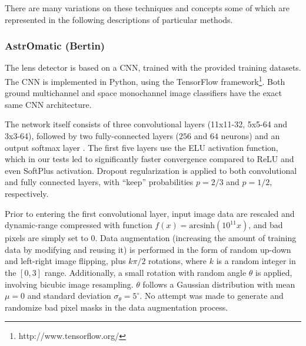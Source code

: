 \documentclass{aa}
\newcommand{\fl}[1]{{\color{magenta}FL: #1}}
\begin{document}
There are many variations on these techniques and concepts some of which are represented in the following descriptions of particular methods.  

\subsubsection{AstrOmatic (Bertin)}

The lens detector is based on a CNN, trained with the provided training datasets. The CNN is implemented in Python, using the TensorFlow framework\footnote{http://www.tensorflow.org/}. Both ground multichannel and space monochannel image classifiers have the exact same CNN architecture.

The network itself consists of three convolutional layers (11x11-32, 5x5-64 and 3x3-64), followed by two fully-connected layers ($256$ and $64$ neurons) and an output softmax layer . The first five layers use the ELU activation function, which in our tests led to significantly faster convergence compared to ReLU and even SoftPlus activation. Dropout regularization is applied to both convolutional and fully connected layers, with ``keep'' probabilities $p=2/3$ and $p=1/2$, respectively.

Prior to entering the first convolutional layer, input image data are rescaled and dynamic-range compressed with function $f(x) =
\mathrm{arcsinh} (10^{11} x)$, and bad pixels are simply set to 0.
Data augmentation (increasing the amount of training data by modifying and reusing it) is performed in the form of random up-down and left-right image flipping, plus $k\pi/2$ rotations, where $k$ is a random integer in the $[0,3]$ range. Additionally, a small rotation with random angle $\theta$ is applied, involving bicubic image resampling. $\theta$ follows a Gaussian distribution with mean $\mu=0$ and standard deviation $\sigma_{\theta}=5^{\circ}$. No attempt was made to generate and randomize bad pixel masks in the data augmentation process.
\end{document}
